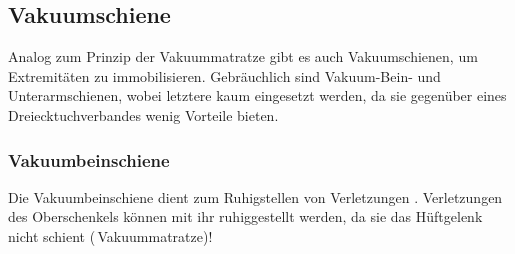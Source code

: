 \begin{ProcedureStepsNoHeading}
{\begin{enumerate}
\end{enumerate}
}{}{}{}{}
\end{ProcedureStepsNoHeading}

\subsection{Vakuumschiene}
\label{topic:vakuumschiene}
\label{topic:vakuumarmschiene}

Analog zum Prinzip der Vakuummatratze gibt es auch
Vakuumschienen, um Extremitäten zu immobilisieren.
Gebräuchlich sind Vakuum-Bein- und Unterarmschienen, wobei
letztere kaum eingesetzt werden, da sie gegenüber eines
Dreiecktuchverbandes wenig Vorteile bieten.

\subsubsection{Vakuumbeinschiene}
\label{topic:vacuumbeinschiene-anwendung}
\label{topic:vacuumbeinschiene-beschreibung}

{%
Die Vakuumbeinschiene dient zum Ruhigstellen von
Verletzungen . Verletzungen des
Oberschenkels können mit ihr  ruhiggestellt werden,
da sie das Hüftgelenk nicht schient
(\,Vakuummatratze)!
% 
}{

}
{}
{}
{}

